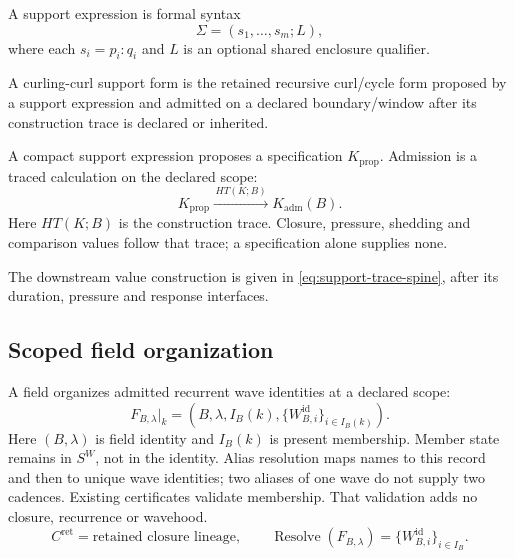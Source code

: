 \begin{definition}
A support expression is formal syntax
\begin{equation}
\Sigma=(s_1,\ldots,s_m;L),
\label{eq:support-expression}
\end{equation}
where each \(s_i=p_i{:}q_i\) and \(L\) is an optional shared enclosure qualifier.
\end{definition}

\begin{definition}
A curling-curl support form is the retained recursive curl/cycle form proposed by a support expression and admitted on a declared boundary/window after its construction trace is declared or inherited.
\end{definition}

A compact support expression proposes a specification \(K_{\mathrm{prop}}\).
Admission is a traced calculation on the declared scope:
\begin{equation}
K_{\mathrm{prop}}
\xrightarrow{\,HT(K;B)\,}
K_{\mathrm{adm}}(B).
\label{eq:key-proposed-admitted-trace}
\end{equation}
Here \(HT(K;B)\) is the construction trace. Closure, pressure, shedding and
comparison values follow that trace; a specification alone supplies none.

The downstream value construction is given in \eqref{eq:support-trace-spine}, after its duration, pressure and response interfaces.



\subsection{Scoped field organization}
\label{sec:field}
\label{sec:field-disposition}
\label{subsec:declared-field-choice}
A field organizes admitted recurrent wave identities at a declared scope:
\begin{equation}
F_{B,\lambda}|_k=(B,\lambda,I_B(k),
\{W^{\mathrm{id}}_{B,i}\}_{i\in I_B(k)}).
\label{eq:field-organization}
\end{equation}
Here \((B,\lambda)\) is field identity and \(I_B(k)\) is present membership.
Member state remains in \(S^W\), not in the identity. Alias resolution maps
names to this record and then to unique wave identities; two aliases of one
wave do not supply two cadences. Existing certificates validate membership.
That validation adds no closure, recurrence or wavehood.
\begin{equation}
C^{\mathrm{ret}}=\text{retained closure lineage},\qquad
\operatorname{Resolve}(F_{B,\lambda})=\{W^{\mathrm{id}}_{B,i}\}_{i\in I_B}.
\label{eq:retained-lineage-field-separation}
\end{equation}
